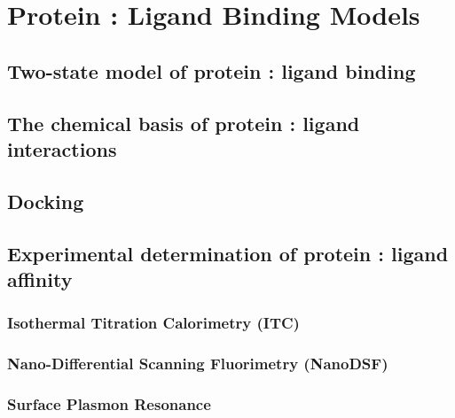 \chapter{Protein : Ligand Binding Models} \label{plbinding}

\section{Two-state model of protein : ligand binding}

\section{The chemical basis of protein : ligand interactions}

\section{Docking}

\section{Experimental determination of protein : ligand affinity}

\subsection{Isothermal Titration Calorimetry (ITC)}

\subsection{Nano-Differential Scanning Fluorimetry (NanoDSF)}

\subsection{Surface Plasmon Resonance}